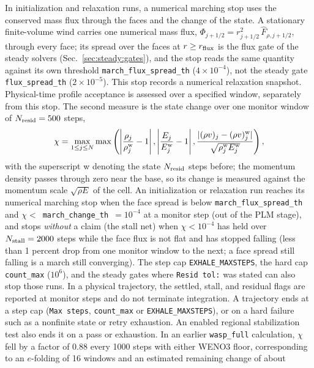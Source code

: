 In initialization and relaxation runs, a numerical marching stop uses the
conserved mass flux through the faces and the change of the state.  A
stationary finite-volume wind carries one numerical mass flux,
$\Phi_{j+1/2} = r_{j+1/2}^2\,\widehat F_{\rho,j+1/2}$, through every face;
its spread over the faces at $r\ge r_{\rm flux}$ is the flux gate of the
steady solvers (Sec.~\ref{sec:steady:gates}), and the stop reads the same
quantity against its own threshold \texttt{march\_flux\_spread\_th}
($4\times10^{-4}$), not the steady gate \texttt{flux\_spread\_th}
($2\times10^{-5}$). This stop records a numerical relaxation snapshot.
Physical-time profile acceptance is assessed over a specified window,
separately from this stop. The second measure is the state change over one
monitor window of $N_{\rm resid}=500$ steps,
%
\begin{equation}
  \chi = \max_{1\le j\le N}\max\left(
     \left|\frac{\rho_j}{\rho_j^{\rm w}}-1\right|,
     \left|\frac{E_j}{E_j^{\rm w}}-1\right|,
     \frac{|(\rho v)_j-(\rho v)_j^{\rm w}|}{\sqrt{\rho_j^{\rm w}E_j^{\rm w}}}\right),
  \label{eq:chi}
\end{equation}
%
with the superscript w denoting the state $N_{\rm resid}$ steps before; the
momentum density passes through zero near the base, so its change is measured
against the momentum scale $\sqrt{\rho E}$ of the cell. An initialization or
relaxation run reaches its numerical marching stop when the face spread is
below \texttt{march\_flux\_spread\_th}
and $\chi < $~\texttt{march\_change\_th}~$=10^{-4}$ at a monitor step (out of the
PLM stage), and stops \emph{without} a claim (the stall net) when $\chi<10^{-4}$
has held over $N_{\rm stall}=2000$ steps while the face flux is not flat and has
stopped falling (less than 1 percent drop from one monitor window to the next;
a face spread still falling is a march still converging). The step cap
\texttt{EXHALE\_MAXSTEPS}, the hard cap \texttt{count\_max} ($10^6$),
and the steady gates where \texttt{Resid tol:} was stated can also stop
those runs. In a physical trajectory, the settled,
stall, and residual flags are reported at monitor steps and do not terminate
integration. A trajectory ends at a step cap (\texttt{Max steps},
\texttt{count\_max} or \texttt{EXHALE\_MAXSTEPS}), or on a hard failure
such as a nonfinite state or retry exhaustion. An enabled
regional stabilization test also ends it on a pass or exhaustion.
In an earlier \texttt{wasp\_full} calculation, $\chi$ fell by a factor
of 0.88 every 1000 steps with either WENO3 floor, corresponding to an
$e$-folding of 16 windows and an estimated remaining change of about

